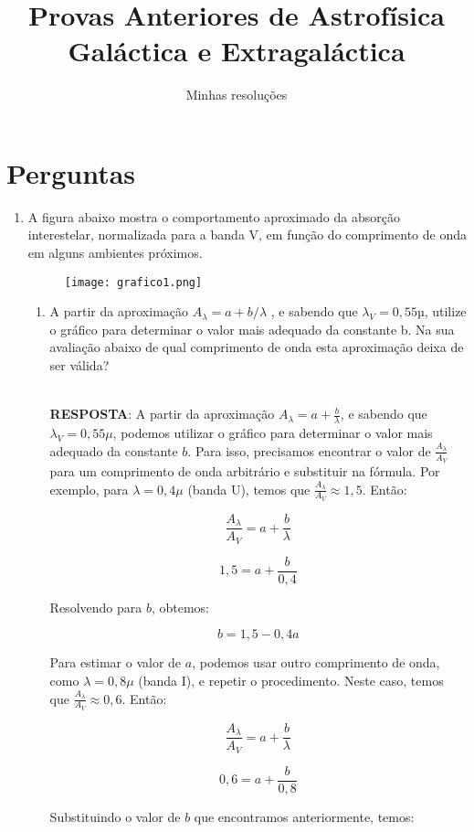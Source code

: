 \documentclass[a4paper,12pt]{article}
\title{Provas Anteriores de Astrofísica Galáctica e Extragaláctica}
\author{Minhas resoluções}
\begin{document}
\maketitle

\section{Perguntas}

\begin{enumerate} \item
A figura abaixo mostra o comportamento aproximado da absorção interestelar, normalizada para a banda V, em função do comprimento de onda em alguns ambientes próximos.

\begin{figure}[!htb]
    \centering
    \texttt{[image: grafico1.png]}
\end{figure}

\begin{enumerate}
\item A partir da aproximação $A_\lambda = a+b/\lambda$ , e sabendo que $\lambda_V = 0,55$µ, utilize o gráfico para determinar o valor mais adequado da constante b. Na sua avaliação abaixo de qual comprimento de onda esta aproximação deixa de 
ser válida?

\noindent\hrulefill\\\textbf{RESPOSTA}: A partir da aproximação $A_\lambda = a + \frac{b}{\lambda}$, e sabendo que $\lambda_V = 0,55\mu$, podemos utilizar o gráfico para determinar o valor mais adequado da constante $b$. Para isso, precisamos encontrar o valor de $\frac{A_\lambda}{A_V}$ para um comprimento de onda arbitrário e substituir na fórmula. Por exemplo, para $\lambda = 0,4\mu$ (banda U), temos que $\frac{A_\lambda}{A_V} \approx 1,5$. Então:

$$\frac{A_\lambda}{A_V} = a + \frac{b}{\lambda}$$

$$1,5 = a + \frac{b}{0,4}$$

Resolvendo para $b$, obtemos:

$$b = 1,5 - 0,4a$$

Para estimar o valor de $a$, podemos usar outro comprimento de onda, como $\lambda = 0,8\mu$ (banda I), e repetir o procedimento. Neste caso, temos que $\frac{A_\lambda}{A_V} \approx 0,6$. Então:

$$\frac{A_\lambda}{A_V} = a + \frac{b}{\lambda}$$

$$0,6 = a + \frac{b}{0,8}$$

Substituindo o valor de $b$ que encontramos anteriormente, temos:


\end{enumerate}
\end{enumerate}
\end{document}
